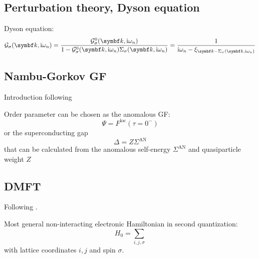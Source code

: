\documentclass[../notes.tex]{subfiles}
\begin{document}


\subsection{Perturbation theory, Dyson equation}




Dyson equation:
\begin{equation}
	\mathcal{G}_{\sigma} (\vb{k}, \iu \omega_n) = \frac{\mathcal{G}_{\sigma}^0 (\vb{k}, \iu \omega_n)}{1 - \mathcal{G}_{\sigma}^0 (\vb{k}, \iu \omega_n) \Sigma_{\sigma} (\vb{k}, \iu \omega_n)} = \frac{1}{\iu \omega_n - \xi_{\vb{k} - \Sigma_{\sigma} (\vb{k}, \iu \omega_n)}}
\end{equation}


\subsection{Nambu-Gorkov GF}

Introduction following~\cite[ch. 14.7]{colemanIntroductionManyBodyPhysics2015}


Order parameter can be chosen as the anomalous GF:
\begin{equation}
	\Psi = F^{\mathrm{loc}} (\tau = 0^-)
\end{equation}
or the superconducting gap
\begin{equation}
	\Delta = Z \Sigma^{\mathrm{AN}}
\end{equation}
that can be calculated from the anomalous self-energy \(\Sigma^{\mathrm{AN}}\) and quasiparticle weight \(Z\)


\subsection{DMFT}

Following \cite{georgesDynamicalMeanfieldTheory1996}.

Most general non-interacting electronic Hamiltonian in second quantization:
\begin{equation}
	H_0 = \sum_{i, j, \sigma}
\end{equation}
with lattice coordinates \(i, j\) and spin \(\sigma\).
\end{document}
